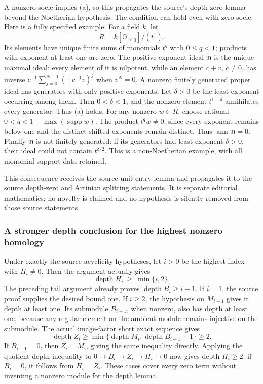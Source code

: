 A nonzero socle implies (a), so this propagates the source's depth-zero lemma beyond the Noetherian hypothesis. The condition can hold even with zero socle. Here is a fully specified example. For a field \(k\), let \[
 R=k[\mathbb Q_{\ge0}]/(t^1).
\] Its elements have unique finite sums of monomials \(t^q\) with \(0\le q<1\); products with exponent at least one are zero. The positive-exponent ideal \(\mathfrak m\) is the unique maximal ideal: every element of it is nilpotent, while an element \(c+v\), \(c\ne0\), has inverse \(c^{-1}\sum_{j=0}^{N-1}(-c^{-1}v)^j\) when \(v^N=0\). A nonzero finitely generated proper ideal has generators with only positive exponents. Let \(\delta>0\) be the least exponent occurring among them. Then \(0<\delta<1\), and the nonzero element \(t^{1-\delta}\) annihilates every generator. Thus (a) holds. For any nonzero \(w\in R\), choose rational \(0<q<1-\max(\operatorname{supp}w)\). The product \(t^qw\ne0\), since every exponent remains below one and the distinct shifted exponents remain distinct. Thus \(\operatorname{ann}\mathfrak m=0\). Finally \(\mathfrak m\) is not finitely generated: if its generators had least exponent \(\delta>0\), their ideal could not contain \(t^{\delta/2}\). This is a non-Noetherian example, with all monomial support data retained.

This consequence receives the source unit-entry lemma and propagates it to the source depth-zero and Artinian splitting statements. It is separate editorial mathematics; no novelty is claimed and no hypothesis is silently removed from those source statements.

\subsubsection{A stronger depth conclusion for the highest nonzero homology}\label{algebra-proof-018-a-stronger-depth-conclusion-for-the-highest-nonzero-homology}

Under exactly the source acyclicity hypotheses, let \(i>0\) be the highest index with \(H_i\ne0\). Then the argument actually gives \[
 \operatorname{depth}H_i\ \ge\ \min\{i,2\}.
\] The preceding tail argument already proves \(\operatorname{depth}B_i\ge i+1\). If \(i=1\), the source proof supplies the desired bound one. If \(i\ge2\), the hypothesis on \(M_{i-1}\) gives it depth at least one. Its submodule \(B_{i-1}\), when nonzero, also has depth at least one, because any regular element on the ambient module remains injective on the submodule. The actual image-factor short exact sequence gives \[
 \operatorname{depth}Z_i\ge
 \min\{\operatorname{depth}M_i,\operatorname{depth}B_{i-1}+1\}\ge2.
\] If \(B_{i-1}=0\), then \(Z_i=M_i\), giving the same inequality directly. Applying the quotient depth inequality to \(0\to B_i\to Z_i\to H_i\to0\) now gives depth \(H_i\ge2\); if \(B_i=0\), it follows from \(H_i=Z_i\). These cases cover every zero term without inventing a nonzero module for the depth lemma.


